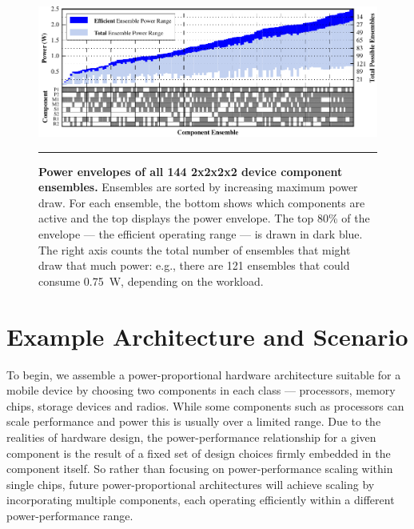 \begin{figure}[t]
\includegraphics{./figures/componentgraph.pdf}

\caption{\small \textbf{Power envelopes of all 144 2x2x2x2 device component
ensembles.} Ensembles are sorted by increasing maximum power draw. For each
ensemble, the bottom shows which components are active and the top displays
the power envelope. The top 80\% of the envelope --- the efficient operating
range --- is drawn in dark blue. The right axis counts the total number of
ensembles that might draw that much power: e.g., there are
121 ensembles that could consume 0.75~W, depending on the workload.}
\vspace{0.10in}
\hrule
\vspace{-0.20in}
\label{figure-componentgraph}
\end{figure}

\section{Example Architecture and Scenario}
\label{section-architectureandscenario}

To begin, we assemble a power-proportional hardware architecture suitable for
a mobile device by choosing two components in each class --- processors,
memory chips, storage devices and radios. While some components such as
processors can scale performance and power this is usually over a limited
range. Due to the realities of hardware design, the power-performance
relationship for a given component is the result of a fixed set of design
choices firmly embedded in the component itself. So rather than focusing on
power-performance scaling within single chips, future power-proportional
architectures will achieve scaling by incorporating multiple components, each
operating efficiently within a different power-performance range.

